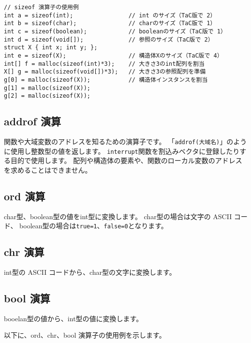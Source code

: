 \begin{mylist}
\begin{verbatim}
// sizeof 演算子の使用例
int a = sizeof(int);                // int のサイズ（TaC版で 2）
int b = sizeof(char);               // charのサイズ（TaC版で 1）
int c = sizeof(boolean);            // booleanのサイズ（TaC版で 1）
int d = sizeof(void[]);             // 参照のサイズ（TaC版で 2）
struct X { int x; int y; };
int e = sizeof(X);                  // 構造体Xのサイズ（TaC版で 4）
int[] f = malloc(sizeof(int)*3);    // 大きさ3のint配列を割当
X[] g = malloc(sizeof(void[])*3);   // 大きさ3の参照配列を準備
g[0] = malloc(sizeof(X));           // 構造体インスタンスを割当
g[1] = malloc(sizeof(X));
g[2] = malloc(sizeof(X));
\end{verbatim}
\end{mylist}

\subsection{addrof 演算}
\label{chap3:addrof}

関数や大域変数のアドレスを知るための演算子です。
「\verb/addrof(大域名)/」のように使用し整数型の値を返します。
\verb/interrupt/関数を割込みベクタに登録したりする目的で使用します。
配列や構造体の要素や、関数のローカル変数のアドレスを求めることはできません。

\subsection{ord 演算}
\label{chap3:ord}

char型、boolean型の値をint型に変換します。
char型の場合は文字の ASCII コード、
boolean型の場合は\verb/true=1/、\verb/false=0/となります。

\subsection{chr 演算}
\label{chap3:chr}

int型の ASCII コードから、char型の文字に変換します。

\subsection{bool 演算}
\label{chap3:chr}

booelan型の値から、int型の値に変換します。

以下に、ord、chr、bool 演算子の使用例を示します。

